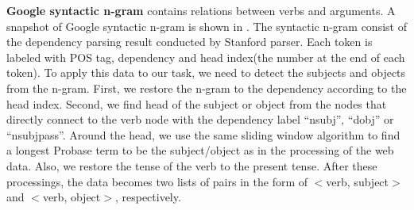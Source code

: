 \textbf{Google syntactic n-gram} contains
relations between verbs and arguments. A snapshot
of Google syntactic n-gram is shown in .
The syntactic n-gram consist of the dependency parsing
result conducted by Stanford parser. Each token is
labeled with POS tag, dependency and head index(the number
at the end of each token). To apply this data
to our task, we need to detect the subjects and objects
from the n-gram. First, we restore the n-gram to the dependency
according to the head index. Second, we find head of the
subject or object from the nodes that directly connect to
the verb node with the dependency label ``nsubj'', ``dobj''
or ``nsubjpass''. Around the head, we use the same sliding window
algorithm to find a longest Probase term to be the subject/object
as in the processing of the web data. Also, we restore the
tense of the verb to the present tense.
After these processings, the data becomes two lists of pairs
in the form of $<$verb, subject$>$ and $<$verb, object$>$, respectively.


